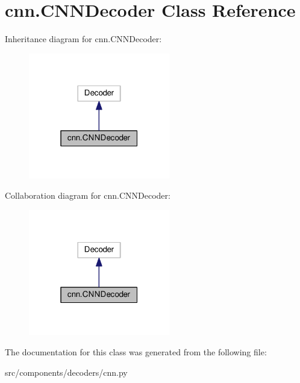 \hypertarget{classcnn_1_1CNNDecoder}{}\section{cnn.\+C\+N\+N\+Decoder Class Reference}
\label{classcnn_1_1CNNDecoder}


Inheritance diagram for cnn.\+C\+N\+N\+Decoder\+:
\nopagebreak
\begin{figure}[H]
\begin{center}
\leavevmode
\includegraphics[width=175pt]{classcnn_1_1CNNDecoder__inherit__graph}
\end{center}
\end{figure}


Collaboration diagram for cnn.\+C\+N\+N\+Decoder\+:
\nopagebreak
\begin{figure}[H]
\begin{center}
\leavevmode
\includegraphics[width=175pt]{classcnn_1_1CNNDecoder__coll__graph}
\end{center}
\end{figure}


The documentation for this class was generated from the following file\+:\begin{DoxyCompactItemize}
\item 
src/components/decoders/cnn.\+py\end{DoxyCompactItemize}
